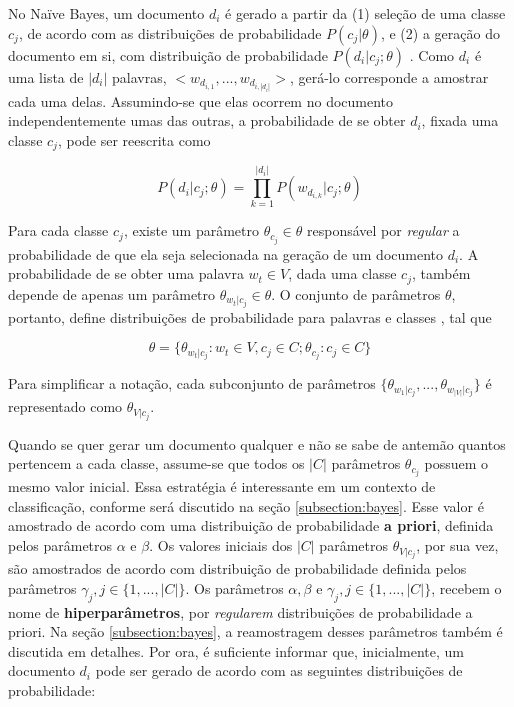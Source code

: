 No Naïve Bayes, um documento \ensuremath{d_i} é gerado a partir da (1) seleção de uma classe \ensuremath{c_j}, de acordo com as distribuições de probabilidade \ensuremath{P(c_j | \theta)}, e (2) a geração do documento em si, com distribuição de probabilidade \ensuremath{P(d_i | c_j ; \theta)} \cite{mccallum-nigam}. Como \ensuremath{d_i} é uma lista de \ensuremath{|d_i|} palavras, \ensuremath{< w_{d_{i,1}}, ..., w_{d_{i,|d_i|}} >}, gerá-lo  corresponde a amostrar cada uma delas. Assumindo-se que elas ocorrem no documento independentemente umas das outras, a probabilidade de se obter \ensuremath{d_i}, fixada uma classe \ensuremath{c_j}, pode ser reescrita como \cite{nigam}  

\begin{equation}
\label{gerando-di}
\ensuremath{P(d_i | c_j ; \theta) = \prod_{k = 1}^{|d_i|}P(w_{d_{i,k}} | c_j ; \theta)}
\end{equation}

Para cada classe \ensuremath{c_j}, existe um parâmetro \ensuremath{\theta_{c_j} \in \theta} responsável por \emph{regular} a probabilidade de que ela seja selecionada na geração de um documento \ensuremath{d_i}. A probabilidade de se obter uma palavra \ensuremath{w_t \in V}, dada uma classe \ensuremath{c_j}, também depende de apenas um parâmetro \ensuremath{\theta_{w_t | c_j} \in \theta}. O conjunto de parâmetros \ensuremath{\theta}, portanto, define distribuições de probabilidade para palavras e classes \cite{nigam}, tal que

\begin{equation}
\label{parametros}
\ensuremath{\theta = \{\theta_{w_t | c_j} : w_t \in V, c_j \in C; \theta_{c_j} : c_j \in C \}}
\end{equation}

Para simplificar a notação, cada subconjunto de parâmetros \ensuremath{\{\theta_{w_1 | c_j}, ..., \theta_{w_{|V|} | c_j}\}} é representado como \ensuremath{\theta_{ V | c_j}}.

Quando se quer gerar um documento qualquer e não se sabe de antemão quantos pertencem a cada classe, assume-se que todos os \ensuremath{|C|} parâmetros \ensuremath{\theta_{c_j}} possuem o mesmo valor inicial. Essa estratégia é interessante em um contexto de classificação, conforme será discutido na seção \ref{subsection:bayes}. Esse valor é amostrado de acordo com uma distribuição de probabilidade \textbf{a priori}, definida pelos parâmetros \ensuremath{\alpha} e \ensuremath{\beta}. Os valores iniciais dos \ensuremath{|C|} parâmetros \ensuremath{\theta_{ V | c_j}}, por sua vez, são amostrados de acordo com distribuição de probabilidade definida pelos parâmetros \ensuremath{\gamma_j, j \in \{1, ..., |C|\}}. Os parâmetros \ensuremath{\alpha, \beta} e \ensuremath{\gamma_j, j \in \{1, ..., |C|\}}, recebem o nome de \textbf{hiperparâmetros}, por \emph{regularem} distribuições de probabilidade a priori. Na seção \ref{subsection:bayes}, a reamostragem desses parâmetros também é discutida em detalhes. Por ora, é suficiente informar que, inicialmente, um documento \ensuremath{d_i} pode ser gerado de acordo com as seguintes distribuições de probabilidade:

